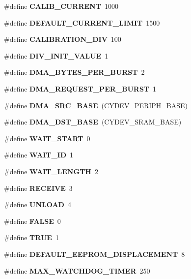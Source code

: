 \begin{DoxyCompactItemize}
\#define {\bfseries C\+A\+L\+I\+B\+\_\+\+C\+U\+R\+R\+E\+NT}~1000
\item 
\mbox{\label{globals_8h_ae0001cc59fb1ba0290c6ef8c2c5692d7}} 
\#define {\bfseries D\+E\+F\+A\+U\+L\+T\+\_\+\+C\+U\+R\+R\+E\+N\+T\+\_\+\+L\+I\+M\+IT}~1500
\item 
\mbox{\label{globals_8h_a80db2dce057c92400a7fb1678bc0b0a8}} 
\#define {\bfseries C\+A\+L\+I\+B\+R\+A\+T\+I\+O\+N\+\_\+\+D\+IV}~100
\item 
\mbox{\label{globals_8h_a14df76a41da04070ee775565e8d67e81}} 
\#define {\bfseries D\+I\+V\+\_\+\+I\+N\+I\+T\+\_\+\+V\+A\+L\+UE}~1
\item 
\mbox{\label{globals_8h_abf6c9afec04b86961e177e0646401ace}} 
\#define {\bfseries D\+M\+A\+\_\+\+B\+Y\+T\+E\+S\+\_\+\+P\+E\+R\+\_\+\+B\+U\+R\+ST}~2
\item 
\mbox{\label{globals_8h_ab4613f8bee68bc68fa6fe94a3ae6d568}} 
\#define {\bfseries D\+M\+A\+\_\+\+R\+E\+Q\+U\+E\+S\+T\+\_\+\+P\+E\+R\+\_\+\+B\+U\+R\+ST}~1
\item 
\mbox{\label{globals_8h_a3cc2eedb40809a1f15ad841c8abbcebf}} 
\#define {\bfseries D\+M\+A\+\_\+\+S\+R\+C\+\_\+\+B\+A\+SE}~(C\+Y\+D\+E\+V\+\_\+\+P\+E\+R\+I\+P\+H\+\_\+\+B\+A\+SE)
\item 
\mbox{\label{globals_8h_aa54e301f446a66cbf8c943d920c8e967}} 
\#define {\bfseries D\+M\+A\+\_\+\+D\+S\+T\+\_\+\+B\+A\+SE}~(C\+Y\+D\+E\+V\+\_\+\+S\+R\+A\+M\+\_\+\+B\+A\+SE)
\item 
\mbox{\label{globals_8h_aea55597952638136c7c929b238904c82}} 
\#define {\bfseries W\+A\+I\+T\+\_\+\+S\+T\+A\+RT}~0
\item 
\mbox{\label{globals_8h_a6a6a0bb02e515a094c3e7ea1bcb66fcc}} 
\#define {\bfseries W\+A\+I\+T\+\_\+\+ID}~1
\item 
\mbox{\label{globals_8h_a235d2d0eac7e9af190ebafb84df37fd9}} 
\#define {\bfseries W\+A\+I\+T\+\_\+\+L\+E\+N\+G\+TH}~2
\item 
\mbox{\label{globals_8h_a3b4d8a5e259fa47a909adefcda3bfb80}} 
\#define {\bfseries R\+E\+C\+E\+I\+VE}~3
\item 
\mbox{\label{globals_8h_abf4aedd34d31b63b63061c975d872580}} 
\#define {\bfseries U\+N\+L\+O\+AD}~4
\item 
\mbox{\label{globals_8h_aa93f0eb578d23995850d61f7d61c55c1}} 
\#define {\bfseries F\+A\+L\+SE}~0
\item 
\mbox{\label{globals_8h_aa8cecfc5c5c054d2875c03e77b7be15d}} 
\#define {\bfseries T\+R\+UE}~1
\item 
\mbox{\label{globals_8h_a0f5a7e2ead9cd507bf8fc9a6f785f012}} 
\#define {\bfseries D\+E\+F\+A\+U\+L\+T\+\_\+\+E\+E\+P\+R\+O\+M\+\_\+\+D\+I\+S\+P\+L\+A\+C\+E\+M\+E\+NT}~8
\item 
\mbox{\label{globals_8h_a887dbd571d7f138cbe0e994e3fcc661b}} 
\#define {\bfseries M\+A\+X\+\_\+\+W\+A\+T\+C\+H\+D\+O\+G\+\_\+\+T\+I\+M\+ER}~250
\end{DoxyCompactItemize}
